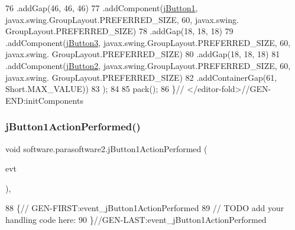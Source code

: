 \begin{DoxyCode}
76                 .addGap(46, 46, 46)
77                 .addComponent(\mbox{\hyperlink{classsoftware_1_1parasoftware2_a4378147bbe05c9a06d9a8b7193295dbb}{jButton1}}, javax.swing.GroupLayout.PREFERRED\_SIZE, 60, javax.swing.
      GroupLayout.PREFERRED\_SIZE)
78                 .addGap(18, 18, 18)
79                 .addComponent(\mbox{\hyperlink{classsoftware_1_1parasoftware2_a32aae8d275502c425e0804761777d920}{jButton3}}, javax.swing.GroupLayout.PREFERRED\_SIZE, 60, javax.swing.
      GroupLayout.PREFERRED\_SIZE)
80                 .addGap(18, 18, 18)
81                 .addComponent(\mbox{\hyperlink{classsoftware_1_1parasoftware2_abaa75d46f51c45dbab64b7bb44e560f0}{jButton2}}, javax.swing.GroupLayout.PREFERRED\_SIZE, 60, javax.swing.
      GroupLayout.PREFERRED\_SIZE)
82                 .addContainerGap(61, Short.MAX\_VALUE))
83         );
84 
85         pack();
86     \}\textcolor{comment}{// </editor-fold>//GEN-END:initComponents}
\end{DoxyCode}
\mbox{\label{classsoftware_1_1parasoftware2_a2f1d046687f61a8eed6ee6109bacaa07}} 
\subsubsection{\texorpdfstring{j\+Button1\+Action\+Performed()}{jButton1ActionPerformed()}}
{\footnotesize\ttfamily void software.\+parasoftware2.\+j\+Button1\+Action\+Performed (\begin{DoxyParamCaption}\item[{java.\+awt.\+event.\+Action\+Event}]{evt }\end{DoxyParamCaption})\hspace{0.3cm}{\ttfamily [inline]}, {\ttfamily [private]}}


\begin{DoxyCode}
88                                                                          \{\textcolor{comment}{//
      GEN-FIRST:event\_jButton1ActionPerformed}
89         \textcolor{comment}{// TODO add your handling code here:}
90     \}\textcolor{comment}{//GEN-LAST:event\_jButton1ActionPerformed}
\end{DoxyCode}
\mbox{\label{classsoftware_1_1parasoftware2_a1255dad965c8f3eb7b309f9d0b10b2b2}} 
